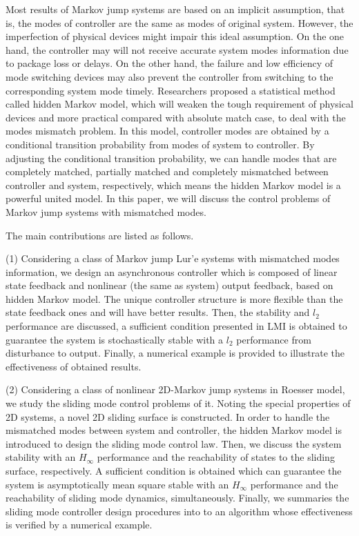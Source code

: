 

\begin{eabstract}
Most results of Markov jump systems are based on an implicit assumption, that is, the modes of controller are the same as modes of original system. However, the imperfection of  physical devices might impair this ideal assumption. On the one hand, the controller may will not receive accurate system modes information due to package loss or delays. On the other hand, the failure and low efficiency of mode switching devices may also prevent the controller from  switching to the corresponding system mode timely. Researchers proposed a  statistical method called hidden Markov model, which will weaken the tough requirement of physical devices and more practical compared with absolute match case, to deal with the modes mismatch problem. In this model, controller modes are obtained by a conditional transition probability from modes of system to controller. By adjusting the conditional transition probability, we can handle modes   that are completely matched, partially matched and completely  mismatched between controller and system, respectively, which means the hidden Markov model is a powerful united model. In this paper, we will discuss the control problems of  Markov jump systems with mismatched modes.

The main contributions are listed as follows.

(1) Considering a class of Markov jump Lur'e systems with mismatched modes information,  we design an asynchronous controller which is composed of  linear state feedback and  nonlinear (the same as system) output feedback, based on hidden Markov model.  The unique controller structure is more flexible  than the  state feedback ones and will have better results. Then, the stability and $l_2$ performance are discussed, a sufficient condition presented in LMI is obtained to guarantee the system is stochastically stable with a $l_2$ performance from disturbance to output. Finally, a numerical example is provided to illustrate the effectiveness of obtained results.

(2) Considering a class of nonlinear 2D-Markov jump systems in Roesser model, we study the sliding mode control problems of it. Noting the special properties of 2D systems, a novel 2D sliding surface is constructed. In order to handle the mismatched modes between system and controller, the hidden Markov model is introduced to design the sliding mode control law. Then, we discuss the system stability with an  $H_\infty$ performance and the reachability of states to the sliding surface, respectively. A sufficient condition is obtained which can guarantee the system is  asymptotically mean square stable with an $H_\infty$  performance and the reachability of sliding mode dynamics, simultaneously. Finally, we summaries  the sliding mode controller design procedures into to an algorithm whose effectiveness is verified by a numerical example. 



\end{eabstract}
